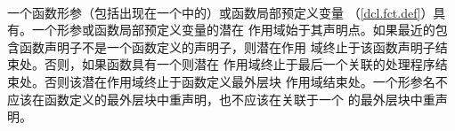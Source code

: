 \paragraph{} %
一个函数形参（包括出现在一个中的）或函数局部预定义变量
（\ref{dcl.fct.def}）具有。一个形参或函数局部预定义变量的潜在
作用域始于其声明点。如果最近的包含函数声明子不是一个函数定义的声明子，则潜在作用
域终止于该函数声明子结束处。否则，如果函数具有一个则潜在
作用域终止于最后一个关联的处理程序结束处。否则该潜在作用域终止于函数定义最外层块
作用域结束处。一个形参名不应该在函数定义的最外层块中重声明，也不应该在关联于一个
的最外层块中重声明。
